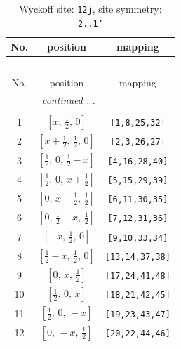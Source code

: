 \documentclass[fleqn,8pt]{jsarticle}
\begin{document}
\begin{longtable}{ccc}
\caption{Wyckoff site: {\tt 12j}, site symmetry: {\tt 2..1'}}
 \\
 \hline \hline
No. & position & mapping \\ \hline \endfirsthead

\multicolumn{2}{l}{\tablename\ \thetable{}} \\
 \hline \hline
No. & position & mapping \\ \hline \endhead

 \hline \hline
\multicolumn{2}{r}{\footnotesize\it continued ...} \\ \endfoot

 \hline \hline
\multicolumn{2}{r}{} \\ \endlastfoot

1 & $\left[ x,\, \frac{1}{2},\, 0 \right]$ & {\tt [1,8,25,32]} \\ \hline
2 & $\left[ x + \frac{1}{2},\, \frac{1}{2},\, 0 \right]$ & {\tt [2,3,26,27]} \\ \hline
3 & $\left[ \frac{1}{2},\, 0,\, \frac{1}{2} - x \right]$ & {\tt [4,16,28,40]} \\ \hline
4 & $\left[ \frac{1}{2},\, 0,\, x + \frac{1}{2} \right]$ & {\tt [5,15,29,39]} \\ \hline
5 & $\left[ 0,\, x + \frac{1}{2},\, \frac{1}{2} \right]$ & {\tt [6,11,30,35]} \\ \hline
6 & $\left[ 0,\, \frac{1}{2} - x,\, \frac{1}{2} \right]$ & {\tt [7,12,31,36]} \\ \hline
7 & $\left[ - x,\, \frac{1}{2},\, 0 \right]$ & {\tt [9,10,33,34]} \\ \hline
8 & $\left[ \frac{1}{2} - x,\, \frac{1}{2},\, 0 \right]$ & {\tt [13,14,37,38]} \\ \hline
9 & $\left[ 0,\, x,\, \frac{1}{2} \right]$ & {\tt [17,24,41,48]} \\ \hline
10 & $\left[ \frac{1}{2},\, 0,\, x \right]$ & {\tt [18,21,42,45]} \\ \hline
11 & $\left[ \frac{1}{2},\, 0,\, - x \right]$ & {\tt [19,23,43,47]} \\ \hline
12 & $\left[ 0,\, - x,\, \frac{1}{2} \right]$ & {\tt [20,22,44,46]} \\
\end{longtable}
\renewcommand{\arraystretch}{1.2}
\end{document}
